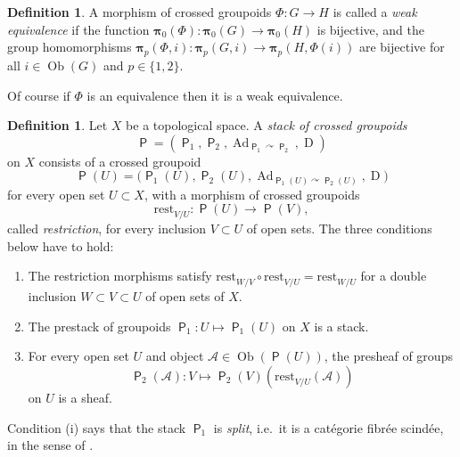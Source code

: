 \documentclass[a4paper, 10pt]{amsart}
\theoremstyle{definition}
\newtheorem{dfn}[equation]{Definition}
\numberwithin{equation}{section}
\newcommand{\opn}{\operatorname}
\newcommand{\cat}[1]{\operatorname{\mathsf{#1}}}
\newcommand{\rmitem}[1]{\item[\text{\textup{(#1)}}]}
\newcommand{\mcal}[1]{\mathcal{#1}}
\newcommand{\mrm}[1]{\mathrm{#1}}
\newcommand{\bsym}[1]{\boldsymbol{#1}}
\newcommand{\twocat}[1]{\operatorname{\bsym{\cat{#1}}}}
\newcommand{\crvar}{\curvearrowright}
\begin{document}
\begin{dfn} \label{dfn:equiv-cosim.102}
A morphism of crossed groupoids $\Phi : G \to H$  
is called a {\em weak equivalence} if the function
$\bsym{\pi}_0(\Phi)  : \bsym{\pi}_0(G) \to \bsym{\pi}_0(H)$
is bijective, and the group homomorphisms
$\bsym{\pi}_p(\Phi, i) : \bsym{\pi}_p(G, i) \to \bsym{\pi}_p(H, \Phi(i))$
are bijective for all $i \in \opn{Ob}(G)$ and 
$p \in \{ 1, 2 \}$.
\end{dfn}

Of course if $\Phi$ is an equivalence then it is a weak equivalence.

\begin{dfn} \label{dfn:200}
Let $X$ be a topological space. A {\em stack of crossed groupoids} 
\[ \twocat{P} = ( \twocat{P}_1, \twocat{P}_2, 
\opn{Ad}_{\twocat{P}_1 \crvar \twocat{P}_{2}}, \opn{D} ) \]
on $X$ consists of a crossed groupoid 
\[ \twocat{P}(U) = \bigl( \twocat{P}_1(U), \twocat{P}_2(U), 
\opn{Ad}_{\twocat{P}_1(U) \crvar \twocat{P}_2(U)}, \opn{D} \bigr) \]
for every open set $U \subset X$, with a morphism of crossed
groupoids 
\[ \mrm{rest}^{}_{V / U} : \twocat{P}(U) \to \twocat{P}(V) , \]
called {\em restriction},
for every inclusion $V \subset U$ of open sets. 
The three conditions below have to hold:
\begin{enumerate}
\rmitem{i} The restriction morphisms satisfy 
$\mrm{rest}^{}_{W / V} \circ \mrm{rest}^{}_{V / U} = \mrm{rest}^{}_{W / U}$
for a double inclusion $W \subset V \subset U$ of open sets of $X$.

\rmitem{ii} The prestack of groupoids 
$\twocat{P}_1 : U \mapsto \twocat{P}_1(U)$
on $X$ is a stack. 

\rmitem{iii} For every open set $U$ and object 
$\mcal{A} \in \opn{Ob}(\twocat{P}(U))$, the presheaf of groups 
\[ \twocat{P}_2(\mcal{A}) : V \mapsto 
\twocat{P}_2(V)(\mrm{rest}^{}_{V / U}(\mcal{A}))  \]
on $U$ is a sheaf.  
\end{enumerate}
\end{dfn}

Condition (i) says that the stack $\twocat{P}_1$ is {\em split}, i.e.\ it is a
cat\'egorie fibr\'ee scind\'ee, in the sense of \cite{Gi}. 
\end{document}
